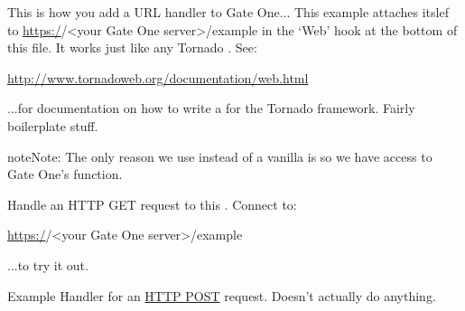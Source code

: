 \documentclass[letterpaper,10pt,openany]{sphinxmanual}
\begin{document}
\begin{fulllineitems}
\label{Applications/terminal/plugin_example:example.ExampleHandler}
This is how you add a URL handler to Gate One...  This example attaches
itslef to \href{https:/}{https:/}/\textless{}your Gate One server\textgreater{}/example in the `Web' hook at the
bottom of this file.  It works just like any Tornado
.  See:

\href{http://www.tornadoweb.org/documentation/web.html}{http://www.tornadoweb.org/documentation/web.html}

...for documentation on how to write a  for
the Tornado framework.  Fairly boilerplate stuff.

\begin{notice}{note}{Note:}
The only reason we use  instead of a vanilla  is so we have access to Gate One's  function.
\end{notice}

\begin{fulllineitems}
\label{Applications/terminal/plugin_example:example.ExampleHandler.get}
Handle an HTTP GET request to this .
Connect to:

\href{https:/}{https:/}/\textless{}your Gate One server\textgreater{}/example

...to try it out.

\end{fulllineitems}


\begin{fulllineitems}
\label{Applications/terminal/plugin_example:example.ExampleHandler.post}
Example Handler for an \href{http://en.wikipedia.org/wiki/POST\_(HTTP)}{HTTP POST}
request.  Doesn't actually do anything.

\end{fulllineitems}


\end{fulllineitems}

\end{document}
